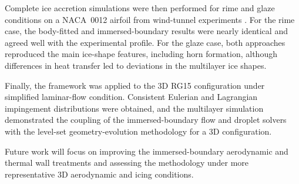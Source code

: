 Complete ice accretion simulations were then performed for rime and glaze conditions on a NACA~0012 airfoil from wind-tunnel experiments \cite{trontin2017description}. For the rime case, the body-fitted and immersed-boundary results were nearly identical and agreed well with the experimental profile. For the glaze case, both approaches reproduced the main ice-shape features, including horn formation, although differences in heat transfer led to deviations in the multilayer ice shapes.

Finally, the framework was applied to the 3D RG15 configuration under simplified laminar-flow condition. Consistent Eulerian and Lagrangian impingement distributions were obtained, and the multilayer simulation demonstrated the coupling of the immersed-boundary flow and droplet solvers with the level-set geometry-evolution methodology for a 3D configuration.

Future work will focus on improving the immersed-boundary aerodynamic and thermal wall treatments and assessing the methodology under more representative 3D aerodynamic and icing conditions.

\newpage
